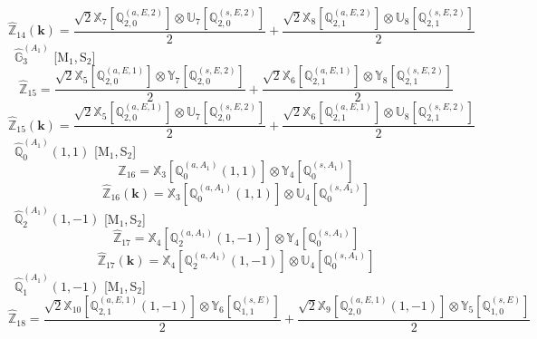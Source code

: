 \documentclass[fleqn,10pt,landscape]{article}
\begin{document}
\begin{itemize}
\begin{dmath*}
\hat{\mathbb{Z}}_{14}(\bm{k})=\frac{\sqrt{2} \mathbb{X}_{7}[\mathbb{Q}_{2,0}^{(a,E,2)}] \otimes\mathbb{U}_{7}[\mathbb{Q}_{2,0}^{(s,E,2)}]}{2} + \frac{\sqrt{2} \mathbb{X}_{8}[\mathbb{Q}_{2,1}^{(a,E,2)}] \otimes\mathbb{U}_{8}[\mathbb{Q}_{2,1}^{(s,E,2)}]}{2}
\end{dmath*}
\vspace{4mm}
\noindent {} $\,\,\,\hat{\mathbb{G}}_{3}^{(A_{1})}$ [M$_{1}$,\,S$_{2}$]
\begin{dmath*}
\hat{\mathbb{Z}}_{15}=\frac{\sqrt{2} \mathbb{X}_{5}[\mathbb{Q}_{2,0}^{(a,E,1)}] \otimes\mathbb{Y}_{7}[\mathbb{Q}_{2,0}^{(s,E,2)}]}{2} + \frac{\sqrt{2} \mathbb{X}_{6}[\mathbb{Q}_{2,1}^{(a,E,1)}] \otimes\mathbb{Y}_{8}[\mathbb{Q}_{2,1}^{(s,E,2)}]}{2}
\end{dmath*}
\begin{dmath*}
\hat{\mathbb{Z}}_{15}(\bm{k})=\frac{\sqrt{2} \mathbb{X}_{5}[\mathbb{Q}_{2,0}^{(a,E,1)}] \otimes\mathbb{U}_{7}[\mathbb{Q}_{2,0}^{(s,E,2)}]}{2} + \frac{\sqrt{2} \mathbb{X}_{6}[\mathbb{Q}_{2,1}^{(a,E,1)}] \otimes\mathbb{U}_{8}[\mathbb{Q}_{2,1}^{(s,E,2)}]}{2}
\end{dmath*}
\vspace{4mm}
\noindent {} $\,\,\,\hat{\mathbb{Q}}_{0}^{(A_{1})}(1,1)$ [M$_{1}$,\,S$_{2}$]
\begin{dmath*}
\hat{\mathbb{Z}}_{16}=\mathbb{X}_{3}[\mathbb{Q}_{0}^{(a,A_{1})}(1,1)] \otimes\mathbb{Y}_{4}[\mathbb{Q}_{0}^{(s,A_{1})}]
\end{dmath*}
\begin{dmath*}
\hat{\mathbb{Z}}_{16}(\bm{k})=\mathbb{X}_{3}[\mathbb{Q}_{0}^{(a,A_{1})}(1,1)] \otimes\mathbb{U}_{4}[\mathbb{Q}_{0}^{(s,A_{1})}]
\end{dmath*}
\vspace{4mm}
\noindent {} $\,\,\,\hat{\mathbb{Q}}_{2}^{(A_{1})}(1,-1)$ [M$_{1}$,\,S$_{2}$]
\begin{dmath*}
\hat{\mathbb{Z}}_{17}=\mathbb{X}_{4}[\mathbb{Q}_{2}^{(a,A_{1})}(1,-1)] \otimes\mathbb{Y}_{4}[\mathbb{Q}_{0}^{(s,A_{1})}]
\end{dmath*}
\begin{dmath*}
\hat{\mathbb{Z}}_{17}(\bm{k})=\mathbb{X}_{4}[\mathbb{Q}_{2}^{(a,A_{1})}(1,-1)] \otimes\mathbb{U}_{4}[\mathbb{Q}_{0}^{(s,A_{1})}]
\end{dmath*}
\vspace{4mm}
\noindent {} $\,\,\,\hat{\mathbb{Q}}_{1}^{(A_{1})}(1,-1)$ [M$_{1}$,\,S$_{2}$]
\begin{dmath*}
\hat{\mathbb{Z}}_{18}=\frac{\sqrt{2} \mathbb{X}_{10}[\mathbb{Q}_{2,1}^{(a,E,1)}(1,-1)] \otimes\mathbb{Y}_{6}[\mathbb{Q}_{1,1}^{(s,E)}]}{2} + \frac{\sqrt{2} \mathbb{X}_{9}[\mathbb{Q}_{2,0}^{(a,E,1)}(1,-1)] \otimes\mathbb{Y}_{5}[\mathbb{Q}_{1,0}^{(s,E)}]}{2}

\end{dmath*}
\end{itemize}
\end{document}
